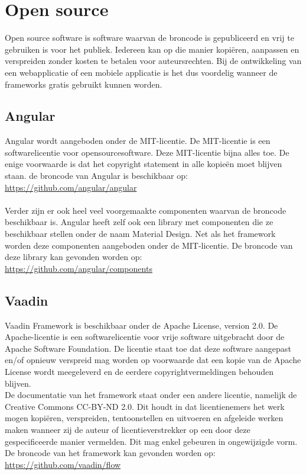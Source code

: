 \section{Open source}
Open source software is software waarvan de broncode is gepubliceerd en vrij te gebruiken is voor het publiek. Iedereen kan op die manier kopiëren, aanpassen en verspreiden zonder kosten te betalen voor auteursrechten.
Bij de ontwikkeling van een webapplicatie of een mobiele applicatie is het dus voordelig wanneer de frameworks gratis gebruikt kunnen worden. 

\subsection{Angular}
Angular wordt aangeboden onder de MIT-licentie.
De MIT-licentie is een softwarelicentie voor opensourcesoftware. Deze MIT-licentie bijna alles toe. De enige voorwaarde is dat het copyright statement in alle kopieën moet blijven staan.
de broncode van Angular is beschikbaar op: 
\\
\url{https://github.com/angular/angular} \\ \\
Verder zijn er ook heel veel voorgemaakte componenten waarvan de broncode beschikbaar is. Angular heeft zelf ook een library met componenten die ze beschikbaar stellen onder de naam Material Design. Net als het framework worden deze componenten aangeboden onder de MIT-licentie. De broncode van deze library kan gevonden worden op:
\\
\url{https://github.com/angular/components}

\subsection{Vaadin}
Vaadin Framework is beschikbaar onder de Apache License, version 2.0.
De Apache-licentie is een softwarelicentie voor vrije software uitgebracht door de Apache Software Foundation. De licentie staat toe dat deze software aangepast en/of opnieuw verspreid mag worden op voorwaarde dat een kopie van de Apache License wordt meegeleverd en de eerdere copyrightvermeldingen behouden blijven.
\\ De documentatie van het framework staat onder een andere licentie, namelijk de Creative Commons CC-BY-ND 2.0. Dit houdt in dat licentienemers  het werk mogen  kopiëren, verspreiden, tentoonstellen en uitvoeren en afgeleide werken maken wanneer zij de auteur of licentieverstrekker op een door deze gespecificeerde manier vermelden. Dit mag enkel gebeuren in ongewijzigde vorm.
\\De broncode van het framework kan gevonden worden op: 
\\ \url{https://github.com/vaadin/flow} \\ \\

